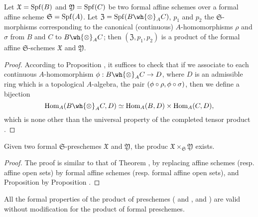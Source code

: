 \begin{prop}[10.7.2]
\label{1.10.7.2}
Let $\mathfrak{X}=\operatorname{Spf}(B)$ and $\mathfrak{Y}=\operatorname{Spf}(C)$ be two formal affine schemes over a formal affine scheme $\mathfrak{S}=\operatorname{Spf}(A)$.
Let $\mathfrak{Z}=\Spf(B\wh{\otimes}_A C)$, $p_1$ and $p_2$ the $\mathfrak{S}$-morphisms corresponding  to the canonical (continuous) $A$-homomorphisms $\rho$ and $\sigma$ from $B$ and $C$ to $B\wh{\otimes}_A C$; then $(\mathfrak{Z},p_1,p_2)$ is a product of the formal affine $\mathfrak{S}$-schemes $\mathfrak{X}$ and $\mathfrak{Y}$.
\end{prop}

\begin{proof}
\label{proof-1.10.7.2}
According to Proposition , it suffices to check that if we associate to each continuous $A$-homomorphism $\vphi:B\wh{\otimes}_A C\to D$, where $D$ is an admissible ring which is a topological $A$-algebra, the pair $(\phi\circ\rho,\phi\circ\sigma)$, then we define a bijection
\[
  \Hom_A(B\wh{\otimes}_A C,D)\isoto\Hom_A(B,D)\times\Hom_A(C,D),
\]
which is none other than the universal property of the completed tensor product .
\end{proof}

\begin{prop}[10.7.3]
\label{1.10.7.3}
Given two formal $\mathfrak{S}$-preschemes $\mathfrak{X}$ and $\mathfrak{Y}$, the produc $\mathfrak{X}\times_\mathfrak{S}\mathfrak{Y}$ exists.
\end{prop}

\begin{proof}
\label{proof-1.10.7.3}
The proof is similar to that of Theorem , by replacing affine schemes (resp. affine open sets) by formal affine schemes (resp. formal affine open sets), and Proposition  by Proposition .
\end{proof}

All the formal properties of the product of preschemes ( and ,  and ) are valid without modification for the product of formal preschemes.

